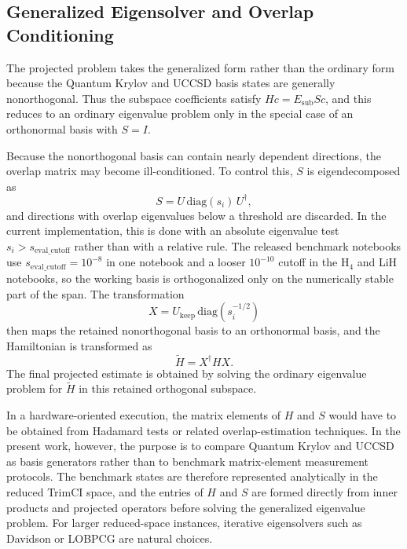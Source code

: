 \subsection{Generalized Eigensolver and Overlap Conditioning}

The projected problem takes the generalized form rather than the ordinary form because the Quantum Krylov and UCCSD basis states are generally nonorthogonal. Thus the subspace coefficients satisfy $Hc = E_{\mathrm{sub}}Sc$, and this reduces to an ordinary eigenvalue problem only in the special case of an orthonormal basis with $S = I$.

Because the nonorthogonal basis can contain nearly dependent directions, the overlap matrix may become ill-conditioned. To control this, $S$ is eigendecomposed as
\begin{equation}
S = U \, \mathrm{diag}(s_i) \, U^{\dagger},
\end{equation}
and directions with overlap eigenvalues below a threshold are discarded. In the current implementation, this is done with an absolute eigenvalue test $s_i > s_{\mathrm{eval\_cutoff}}$ rather than with a relative rule. The released benchmark notebooks use $s_{\mathrm{eval\_cutoff}} = 10^{-8}$ in one notebook and a looser $10^{-10}$ cutoff in the H$_4$ and LiH notebooks, so the working basis is orthogonalized only on the numerically stable part of the span. The transformation
\begin{equation}
X = U_{\mathrm{keep}} \, \mathrm{diag}(s_i^{-1/2})
\end{equation}
then maps the retained nonorthogonal basis to an orthonormal basis, and the Hamiltonian is transformed as
\begin{equation}
\widetilde{H} = X^{\dagger} H X .
\end{equation}
The final projected estimate is obtained by solving the ordinary eigenvalue problem for $\widetilde{H}$ in this retained orthogonal subspace.

In a hardware-oriented execution, the matrix elements of $H$ and $S$ would have to be obtained from Hadamard tests or related overlap-estimation techniques. In the present work, however, the purpose is to compare Quantum Krylov and UCCSD as basis generators rather than to benchmark matrix-element measurement protocols. The benchmark states are therefore represented analytically in the reduced TrimCI space, and the entries of $H$ and $S$ are formed directly from inner products and projected operators before solving the generalized eigenvalue problem. For larger reduced-space instances, iterative eigensolvers such as Davidson or LOBPCG are natural choices.

